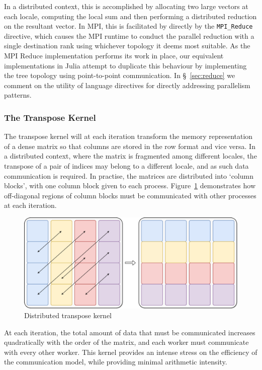 \documentclass{juliacon}
\begin{document}
In a distributed context, this is accomplished by allocating two large
vectors at each locale, computing the local sum and then performing a
distributed reduction on the resultant vector. In MPI, this is
facilitated by directly by the \texttt{MPI\_Reduce} directive, which
causes the MPI runtime to conduct the parallel reduction with a single
destination rank using whichever topology it deems most suitable. As the
MPI Reduce implementation performs its work in place, our equivalent
implementations in Julia attempt to duplicate this behaviour by
implementing the tree topology using point-to-point communication. In
\S~\ref{sec:reduce} we comment on the utility of language
directives for directly addressing parallelism patterns.

\subsubsection{The Transpose Kernel}
\label{sec:transpose-kernel}

The transpose kernel will at each iteration transform the memory
representation of a dense matrix so that columns are stored in the row
format and vice versa. In a distributed context, where the matrix is
fragmented among different locales, the transpose of a pair of indices
may belong to a different locale, and as such data communication is
required. In practise, the matrices are distributed into `column
blocks', with one column block given to each process. Figure~\ref{fig:transpose-diagram} demonstrates how off-diagonal regions of
column blocks must be communicated with other processes at each
iteration.

\begin{figure}[htb]
	\includegraphics[width=\linewidth]{figs/Transpose.pdf}
	\caption{Distributed transpose kernel}
	\label{fig:transpose-diagram}
\end{figure}

At each iteration, the total amount of data that must be communicated
increases quadratically with the order of the matrix, and each worker
must communicate with every other worker. This kernel provides an
intense stress on the efficiency of the communication model, while
providing minimal arithmetic intensity.
\end{document}

